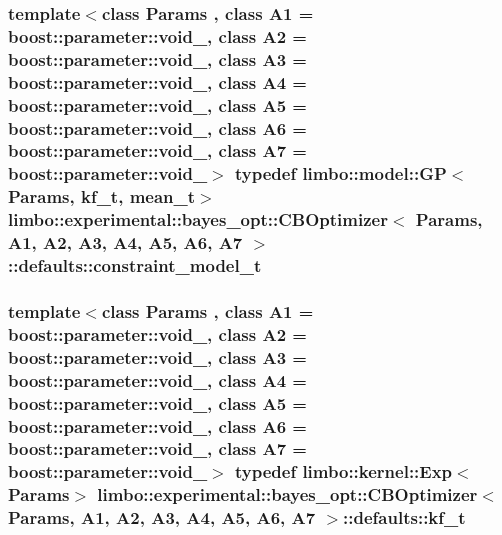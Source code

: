 \subsubsection[{constraint\+\_\+model\+\_\+t}]{\setlength{\rightskip}{0pt plus 5cm}template$<$class Params , class A1  = boost\+::parameter\+::void\+\_\+, class A2  = boost\+::parameter\+::void\+\_\+, class A3  = boost\+::parameter\+::void\+\_\+, class A4  = boost\+::parameter\+::void\+\_\+, class A5  = boost\+::parameter\+::void\+\_\+, class A6  = boost\+::parameter\+::void\+\_\+, class A7  = boost\+::parameter\+::void\+\_\+$>$ typedef {\bf limbo\+::model\+::\+G\+P}$<$Params, {\bf kf\+\_\+t}, {\bf mean\+\_\+t}$>$ {\bf limbo\+::experimental\+::bayes\+\_\+opt\+::\+C\+B\+Optimizer}$<$ Params, A1, A2, A3, A4, A5, A6, A7 $>$\+::{\bf defaults\+::constraint\+\_\+model\+\_\+t}}\label{structlimbo_1_1experimental_1_1bayes__opt_1_1_c_b_optimizer_1_1defaults_afbbb3a7663e1cabe65b094bca5bebc75}
\hypertarget{structlimbo_1_1experimental_1_1bayes__opt_1_1_c_b_optimizer_1_1defaults_ad111c343608ef57fcb008aba61bd8803}{}
\subsubsection[{kf\+\_\+t}]{\setlength{\rightskip}{0pt plus 5cm}template$<$class Params , class A1  = boost\+::parameter\+::void\+\_\+, class A2  = boost\+::parameter\+::void\+\_\+, class A3  = boost\+::parameter\+::void\+\_\+, class A4  = boost\+::parameter\+::void\+\_\+, class A5  = boost\+::parameter\+::void\+\_\+, class A6  = boost\+::parameter\+::void\+\_\+, class A7  = boost\+::parameter\+::void\+\_\+$>$ typedef {\bf limbo\+::kernel\+::\+Exp}$<$Params$>$ {\bf limbo\+::experimental\+::bayes\+\_\+opt\+::\+C\+B\+Optimizer}$<$ Params, A1, A2, A3, A4, A5, A6, A7 $>$\+::{\bf defaults\+::kf\+\_\+t}}\label{structlimbo_1_1experimental_1_1bayes__opt_1_1_c_b_optimizer_1_1defaults_ad111c343608ef57fcb008aba61bd8803}
\hypertarget{structlimbo_1_1experimental_1_1bayes__opt_1_1_c_b_optimizer_1_1defaults_a6f42eec8660a35b4f1eb066af0c1b2b9}{}
